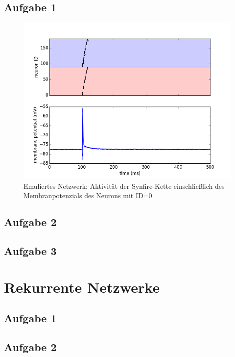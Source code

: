 \documentclass[10pt,a4paper]{scrartcl}
\begin{document}
\subsection{Aufgabe 1}

\begin{figure} [ht]
\begin{center}
\label{fig:abb4}
\caption{Emuliertes Netzwerk: Aktivität der Synfire-Kette einschließlich des Membranpotenzials des Neurons mit ID=0}
\includegraphics[scale=0.35]{pictures/feed_forward_synfire_behavior.png}
\end{center}
\end{figure}

\subsection{Aufgabe 2}


\subsection{Aufgabe 3}


\newpage


\section{Rekurrente Netzwerke}


\subsection{Aufgabe 1}


\subsection{Aufgabe 2}
\end{document}
